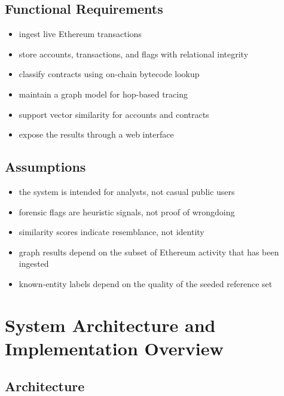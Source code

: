 \documentclass[11pt,a4paper]{article}
\begin{document}
\subsection{Functional Requirements}

\begin{itemize}
\item ingest live Ethereum transactions
\item store accounts, transactions, and flags with relational integrity
\item classify contracts using on-chain bytecode lookup
\item maintain a graph model for hop-based tracing
\item support vector similarity for accounts and contracts
\item expose the results through a web interface
\end{itemize}

\subsection{Assumptions}

\begin{itemize}
\item the system is intended for analysts, not casual public users
\item forensic flags are heuristic signals, not proof of wrongdoing
\item similarity scores indicate resemblance, not identity
\item graph results depend on the subset of Ethereum activity that has been ingested
\item known-entity labels depend on the quality of the seeded reference set
\end{itemize}

\section{System Architecture and Implementation Overview}

\subsection{Architecture}
\end{document}
